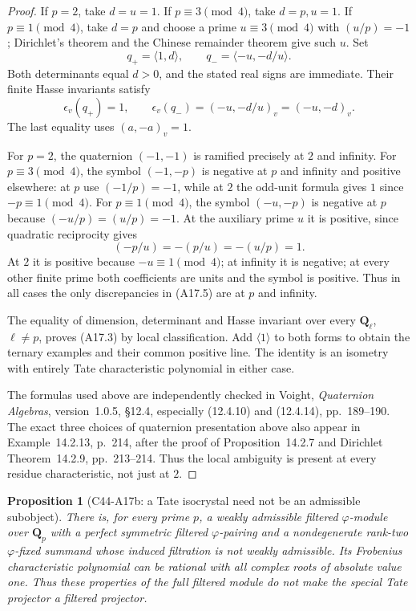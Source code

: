 \documentclass[11pt]{article}
\newtheorem{proposition}[theorem]{Proposition}
\theoremstyle{remark}\newtheorem{remark}[theorem]{Remark}
\begin{document}
\begin{proof}
If $p=2$, take $d=u=1$. If $p\equiv3\pmod4$, take
$d=p,u=1$. If $p\equiv1\pmod4$, take $d=p$ and choose
a prime $u\equiv3\pmod4$ with $(u/p)=-1$; Dirichlet's
theorem and the Chinese remainder theorem give such $u$.
Set
\[
                   q_+=\langle1,d\rangle,
 \qquad            q_-=\langle-u,-d/u\rangle.
 \tag{A17.4}
\]
Both determinants equal $d>0$, and the stated real signs
are immediate. Their finite Hasse invariants satisfy
\[
       \epsilon_v(q_+)=1,
 \qquad\epsilon_v(q_-)=(-u,-d/u)_v=(-u,-d)_v.
 \tag{A17.5}
\]
The last equality uses $(a,-a)_v=1$.

For $p=2$, the quaternion $(-1,-1)$ is ramified precisely
at $2$ and infinity. For $p\equiv3\pmod4$, the symbol
$(-1,-p)$ is negative at $p$ and infinity and positive
elsewhere: at $p$ use $(-1/p)=-1$, while at $2$ the
odd-unit formula gives $1$ since $-p\equiv1\pmod4$.
For $p\equiv1\pmod4$, the symbol $(-u,-p)$ is negative
at $p$ because $(-u/p)=(u/p)=-1$. At the auxiliary prime
$u$ it is positive, since quadratic reciprocity gives
\[
                     (-p/u)=-(p/u)=-(u/p)=1.
\]
At $2$ it is positive because $-u\equiv1\pmod4$;
at infinity it is negative; at every other finite prime
both coefficients are units and the symbol is positive.
Thus in all cases the only discrepancies in (A17.5)
are at $p$ and infinity.

The equality of dimension, determinant and Hasse invariant
over every $\mathbf Q_\ell$, $\ell\ne p$, proves (A17.3)
by local classification. Add $\langle1\rangle$ to both
forms to obtain the ternary examples and their common
positive line. The identity is an isometry with entirely
Tate characteristic polynomial in either case.

The formulas used above are independently checked in
Voight, \emph{Quaternion Algebras}, version~1.0.5,
\S12.4, especially (12.4.10) and (12.4.14), pp.~189--190.
The exact three choices of quaternion presentation above
also appear in Example~14.2.13, p.~214, after the proof
of Proposition~14.2.7 and Dirichlet Theorem~14.2.9,
pp.~213--214. Thus the local ambiguity is present at
every residue characteristic, not just at $2$.
\end{proof}

\begin{proposition}[C44-A17b: a Tate isocrystal need not be an admissible subobject]
There is, for every prime $p$, a weakly admissible filtered
$\varphi$-module over $\mathbf Q_p$ with a perfect symmetric
filtered $\varphi$-pairing and a nondegenerate rank-two
$\varphi$-fixed summand whose induced filtration is not
weakly admissible. Its Frobenius characteristic polynomial
can be rational with all complex roots of absolute value one.
Thus these properties of the full filtered module do not
make the special Tate projector a filtered projector.
\end{proposition}
\end{document}
